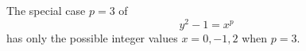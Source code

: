 \begin{proposition}
    The special case $p=3$ of
\[
    y^2-1=x^p
\]
    has only the possible integer values $x=0,-1,2$ when $p=3$.
\end{proposition}
